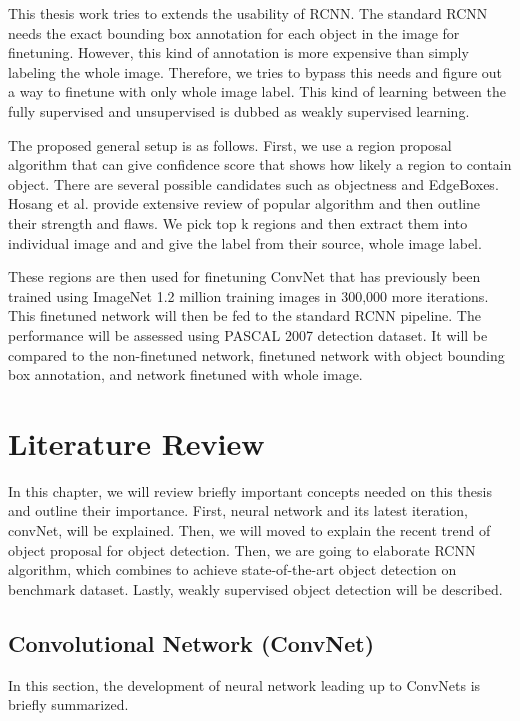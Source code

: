 \documentclass[a4paper,11pt]{kth-mag}
\begin{document}
This thesis work tries to extends the usability of RCNN. The standard RCNN needs the exact bounding box annotation for each object in the image for finetuning. However, this kind of annotation is more expensive than simply labeling the whole image. Therefore, we tries to bypass this needs and figure out a way to finetune with only whole image label. This kind of learning between the fully supervised and unsupervised is dubbed as weakly supervised learning.

The proposed general setup is as follows. First, we use a region proposal algorithm that can give confidence score that shows how likely a region to contain object. There are several possible candidates such as objectness \cite{obj} and EdgeBoxes. Hosang et al. \cite{hosang2014} provide extensive review of popular algorithm and then outline their strength and flaws. We pick top k regions and then extract them into individual image and and give the label from their source, whole image label.

These regions are then used for finetuning ConvNet that has previously been trained using ImageNet 1.2 million training images in 300,000 more iterations. This finetuned network will then be fed to the standard RCNN pipeline. The performance will be assessed using PASCAL 2007 detection dataset. It will be compared to the non-finetuned network, finetuned network with object bounding box annotation, and network finetuned with whole image.


\chapter{Literature Review}
In this chapter, we will review briefly important concepts needed on this thesis and outline their importance. First, neural network and its latest iteration, convNet, will be explained. Then, we will moved to explain the recent trend of object proposal for object detection. Then, we are going to elaborate RCNN algorithm, which combines to achieve state-of-the-art object detection on benchmark dataset. Lastly, weakly supervised object detection will be described.

\section{Convolutional Network (ConvNet)}
In this section, the development of neural network leading up to ConvNets is briefly summarized.
\end{document}
